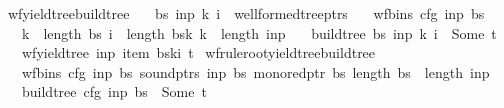 \begin{isabellebody}
\ wf{\isacharunderscore}{\kern0pt}yield{\isacharunderscore}{\kern0pt}tree{\isacharunderscore}{\kern0pt}build{\isacharunderscore}{\kern0pt}tree{\isacharprime}{\kern0pt}{\isacharcolon}{\kern0pt}\isanewline
\ \ \ {\isachardoublequoteopen}{\isacharparenleft}{\kern0pt}bs{\isacharcomma}{\kern0pt}\ inp{\isacharcomma}{\kern0pt}\ k{\isacharcomma}{\kern0pt}\ i{\isacharparenright}{\kern0pt}\ {\isasymin}\ wellformed{\isacharunderscore}{\kern0pt}tree{\isacharunderscore}{\kern0pt}ptrs{\isachardoublequoteclose}\isanewline
\ \ \ {\isachardoublequoteopen}wf{\isacharunderscore}{\kern0pt}bins\ cfg\ inp\ bs{\isachardoublequoteclose}\isanewline
\ \ \ {\isachardoublequoteopen}k\ {\isacharless}{\kern0pt}\ length\ bs{\isachardoublequoteclose}\ {\isachardoublequoteopen}i\ {\isacharless}{\kern0pt}\ length\ {\isacharparenleft}{\kern0pt}bs{\isacharbang}{\kern0pt}k{\isacharparenright}{\kern0pt}{\isachardoublequoteclose}\ {\isachardoublequoteopen}k\ {\isasymle}\ length\ inp{\isachardoublequoteclose}\isanewline
\ \ \ {\isachardoublequoteopen}build{\isacharunderscore}{\kern0pt}tree{\isacharprime}{\kern0pt}\ bs\ inp\ k\ i\ {\isacharequal}{\kern0pt}\ Some\ t{\isachardoublequoteclose}\isanewline
\ \ \ {\isachardoublequoteopen}wf{\isacharunderscore}{\kern0pt}yield{\isacharunderscore}{\kern0pt}tree\ inp\ {\isacharparenleft}{\kern0pt}item\ {\isacharparenleft}{\kern0pt}bs{\isacharbang}{\kern0pt}k{\isacharbang}{\kern0pt}i{\isacharparenright}{\kern0pt}{\isacharparenright}{\kern0pt}\ t{\isachardoublequoteclose}%
\isadelimproof
%
\endisadelimproof
%
\isatagproof
%
\endisatagproof
{\isafoldproof}%
%
\isadelimproof
\isanewline
%
\endisadelimproof
{}\isamarkupfalse%
\ wf{\isacharunderscore}{\kern0pt}rule{\isacharunderscore}{\kern0pt}root{\isacharunderscore}{\kern0pt}yield{\isacharunderscore}{\kern0pt}tree{\isacharunderscore}{\kern0pt}build{\isacharunderscore}{\kern0pt}tree{\isacharcolon}{\kern0pt}\isanewline
\ \ \ {\isachardoublequoteopen}wf{\isacharunderscore}{\kern0pt}bins\ cfg\ inp\ bs{\isachardoublequoteclose}\ {\isachardoublequoteopen}sound{\isacharunderscore}{\kern0pt}ptrs\ inp\ bs{\isachardoublequoteclose}\ {\isachardoublequoteopen}mono{\isacharunderscore}{\kern0pt}red{\isacharunderscore}{\kern0pt}ptr\ bs{\isachardoublequoteclose}\ {\isachardoublequoteopen}length\ bs\ {\isacharequal}{\kern0pt}\ length\ inp\ {\isacharplus}{\kern0pt}\ {}{\isachardoublequoteclose}\isanewline
\ \ \ {\isachardoublequoteopen}build{\isacharunderscore}{\kern0pt}tree\ cfg\ inp\ bs\ {\isacharequal}{\kern0pt}\ Some\ t{\isachardoublequoteclose}\isanewline

\end{isabellebody}
